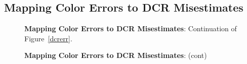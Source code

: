 \documentclass[DM,toc]{lsstdoc}
\begin{document}
\subsection{Mapping Color Errors to DCR Misestimates \label{appx:dcrerr}}
\begin{figure}[h]
    \centering
    \caption[]{\textbf{Mapping Color Errors to DCR Misestimates}: Continuation of Figure~\ref{dcrerr}.}
    \label{dcrerr2}
\end{figure}
\begin{figure}
    \ContinuedFloat
    \centering
    \caption[]{\textbf{Mapping Color Errors to DCR Misestimates}: (cont)}
    \label{dcrerr2}
\end{figure}
\end{document}
